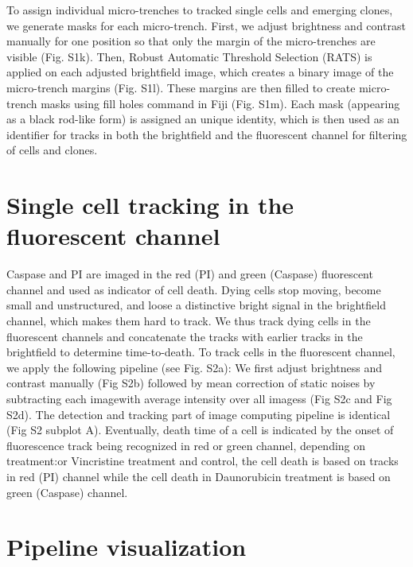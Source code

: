 \documentclass[pdftex,12pt,a4paper]{report}
\begin{document}

To assign individual micro-trenches to tracked single cells and emerging clones, we generate masks for each micro-trench. First, we adjust brightness and contrast manually for one position so that only the margin of the micro-trenches are visible (Fig. S1k). Then, Robust Automatic Threshold Selection (RATS) is applied on each adjusted brightfield image, which creates a binary image of the micro-trench margins (Fig. S1l). These margins are then filled to create micro-trench masks using fill holes command in Fiji (Fig. S1m). Each mask (appearing as a black rod-like form) is assigned an unique identity, which is then used as an identifier for tracks in both the brightfield and the fluorescent channel for filtering of cells and clones.

\section{Single cell tracking in the fluorescent channel}


Caspase and PI are imaged in the red (PI) and green (Caspase) fluorescent channel and used as indicator of cell death. Dying cells stop moving, become small and unstructured, and loose a distinctive bright signal in the brightfield channel, which makes them hard to track. We thus track dying cells in the fluorescent channels and concatenate the tracks with earlier tracks in the brightfield to determine time-to-death. To track cells in the fluorescent channel, we apply the following pipeline (see Fig. S2a): We first adjust brightness and contrast manually (Fig S2b) followed by mean correction of static noises by subtracting each imagewith average intensity over all imagess (Fig S2c and Fig S2d). The detection and tracking part of image computing pipeline is identical (Fig S2 subplot A). Eventually, death time of a cell is indicated by the onset of fluorescence track being recognized in red or green channel, depending on treatment:or Vincristine treatment and control, the cell death is based on tracks in red (PI) channel while the cell death in Daunorubicin treatment is based on green (Caspase) channel.

\section{Pipeline visualization}
\end{document}
